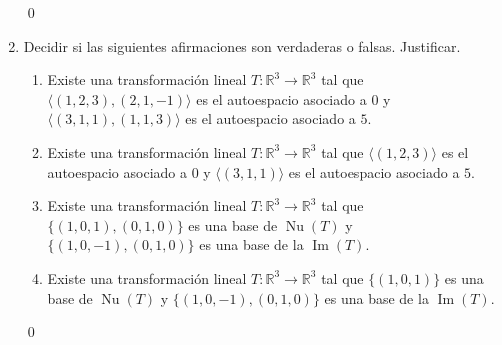 \begin{enumerate}[topsep=6pt, itemsep=.4cm]
\rta


\qed



\item Decidir si las siguientes afirmaciones son verdaderas o falsas. Justificar. 
\begin{enumerate}
    \item\label{tl-V-o-F-a} Existe una transformación lineal $T:\mathbb{R}^3\longrightarrow\mathbb{R}^3$ tal que $\langle(1,2,3),(2,1,-1)\rangle$ es el autoespacio asociado a $0$ y $\langle(3,1,1),(1,1,3)\rangle$ es el autoespacio asociado a $5$.
    \item\label{tl-V-o-F-b} Existe una transformación lineal $T:\mathbb{R}^3\longrightarrow\mathbb{R}^3$ tal que $\langle(1,2,3)\rangle$ es el autoespacio asociado a $0$ y $\langle(3,1,1)\rangle$ es el autoespacio asociado a $5$.
    \item\label{tl-V-o-F-c} Existe una transformación lineal $T:\mathbb{R}^3\longrightarrow\mathbb{R}^3$ tal que $\{(1,0,1), (0,1,0)\}$ es una base de $\operatorname{Nu}(T)$ y  $\{(1,0,-1), (0,1,0)\}$ es una base de la $\operatorname{Im}(T)$.
    \item\label{tl-V-o-F-d} Existe una transformación lineal $T:\mathbb{R}^3\longrightarrow\mathbb{R}^3$ tal que $\{(1,0,1)\}$ es una base de $\operatorname{Nu}(T)$ y  $\{(1,0,-1), (0,1,0)\}$ es una base de la $\operatorname{Im}(T)$. 
\end{enumerate}

\rta


\qed


\end{enumerate}


